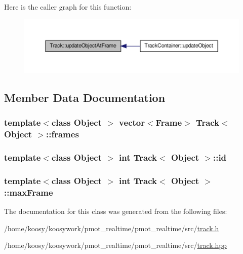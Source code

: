 \-Here is the caller graph for this function\-:
\nopagebreak
\begin{figure}[H]
\begin{center}
\leavevmode
\includegraphics[width=350pt]{class_track_adad8d1dfac6b1a5b235a7ed4ec6ba256_icgraph}
\end{center}
\end{figure}




\subsection{\-Member \-Data \-Documentation}
\hypertarget{class_track_a6ff7e559c1063626fd12c0036c61b637}{
\subsubsection[{frames}]{\setlength{\rightskip}{0pt plus 5cm}template$<$class Object $>$ vector$<${\bf \-Frame}$>$ {\bf \-Track}$<$ \-Object $>$\-::{\bf frames}}}\label{class_track_a6ff7e559c1063626fd12c0036c61b637}
\hypertarget{class_track_a8801bf2eacdc01214358b8003a465a11}{
\subsubsection[{id}]{\setlength{\rightskip}{0pt plus 5cm}template$<$class Object $>$ int {\bf \-Track}$<$ \-Object $>$\-::{\bf id}}}\label{class_track_a8801bf2eacdc01214358b8003a465a11}
\hypertarget{class_track_aa39a73ae3067ccfd9693bd778e96e729}{
\subsubsection[{max\-Frame}]{\setlength{\rightskip}{0pt plus 5cm}template$<$class Object $>$ int {\bf \-Track}$<$ \-Object $>$\-::{\bf max\-Frame}}}\label{class_track_aa39a73ae3067ccfd9693bd778e96e729}


\-The documentation for this class was generated from the following files\-:\begin{DoxyCompactItemize}
\item 
/home/koosy/koosywork/pmot\-\_\-realtime/pmot\-\_\-realtime/src/\hyperlink{track_8h}{track.\-h}\item 
/home/koosy/koosywork/pmot\-\_\-realtime/pmot\-\_\-realtime/src/\hyperlink{track_8hpp}{track.\-hpp}\end{DoxyCompactItemize}
